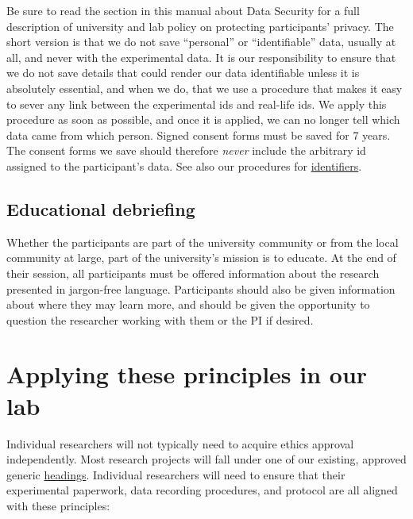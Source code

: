 \documentclass[12pt,]{book}
\theoremstyle{definition}
\theoremstyle{definition}
\theoremstyle{definition}
\theoremstyle{remark}
\begin{document}
Be sure to read the section in this manual about Data Security for a
full description of university and lab policy on protecting
participants' privacy. The short version is that we do not save
``personal'' or ``identifiable'' data, usually at all, and never with
the experimental data. It is our responsibility to ensure that we do not
save details that could render our data identifiable unless it is
absolutely essential, and when we do, that we use a procedure that makes
it easy to sever any link between the experimental ids and real-life
ids. We apply this procedure as soon as possible, and once it is
applied, we can no longer tell which data came from which person. Signed
consent forms must be saved for 7 years. The consent forms we save
should therefore \emph{never} include the arbitrary id assigned to the
participant's data. See also our procedures for
\protect\hyperlink{identifiers-and-data}{identifiers}.

\subsection{Educational debriefing}\label{educational-debriefing}

Whether the participants are part of the university community or from
the local community at large, part of the university's mission is to
educate. At the end of their session, all participants must be offered
information about the research presented in jargon-free language.
Participants should also be given information about where they may learn
more, and should be given the opportunity to question the researcher
working with them or the PI if desired.

\section{Applying these principles in our
lab}\label{applying-these-principles-in-our-lab}

Individual researchers will not typically need to acquire ethics
approval independently. Most research projects will fall under one of
our existing, approved generic
\protect\hyperlink{ethics-approvals-currently-in-place}{headings}.
Individual researchers will need to ensure that their experimental
paperwork, data recording procedures, and protocol are all aligned with
these principles:
\end{document}
